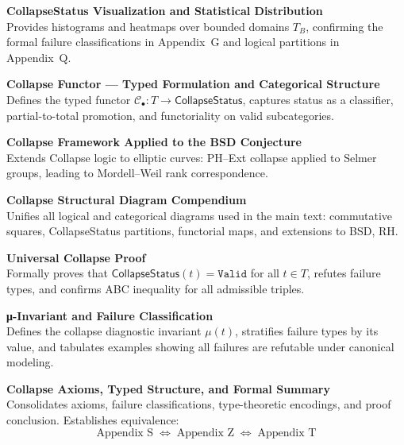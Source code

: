 \documentclass[11pt]{article}
\begin{document}
\begin{description}[leftmargin=3.6cm, labelsep=1.0cm]
\item[\textbf{Appendix H}]  
\textbf{CollapseStatus Visualization and Statistical Distribution}  
\\
Provides histograms and heatmaps over bounded domains \( T_B \),  
confirming the formal failure classifications in Appendix~G and logical partitions in Appendix~Q.

\item[\textbf{Appendix Q}]  
\textbf{Collapse Functor — Typed Formulation and Categorical Structure}  
\\
Defines the typed functor \( \mathcal{C}_\bullet : T \to \mathsf{CollapseStatus} \),  
captures status as a classifier, partial-to-total promotion, and functoriality on valid subcategories.

\item[\textbf{Appendix R}]  
\textbf{Collapse Framework Applied to the BSD Conjecture}  
\\
Extends Collapse logic to elliptic curves:  
PH–Ext collapse applied to Selmer groups, leading to Mordell–Weil rank correspondence.

\item[\textbf{Appendix S}]  
\textbf{Collapse Structural Diagram Compendium}  
\\
Unifies all logical and categorical diagrams used in the main text:  
commutative squares, CollapseStatus partitions, functorial maps, and extensions to BSD, RH.

\item[\textbf{Appendix T}]  
\textbf{Universal Collapse Proof}  
\\
Formally proves that \( \mathsf{CollapseStatus}(t) = \texttt{Valid} \) for all \( t \in T \),  
refutes failure types, and confirms ABC inequality for all admissible triples.

\item[\textbf{Appendix U}]  
\textbf{μ-Invariant and Failure Classification}  
\\
Defines the collapse diagnostic invariant \( \mu(t) \), stratifies failure types by its value,  
and tabulates examples showing all failures are refutable under canonical modeling.

\item[\textbf{Appendix Z}]  
\textbf{Collapse Axioms, Typed Structure, and Formal Summary}  
\\
Consolidates axioms, failure classifications, type-theoretic encodings, and  
proof conclusion. Establishes equivalence:  
\[
\text{Appendix S} \;\Longleftrightarrow\; \text{Appendix Z} \;\Longleftrightarrow\; \text{Appendix T}
\]

\end{description}
\end{document}
